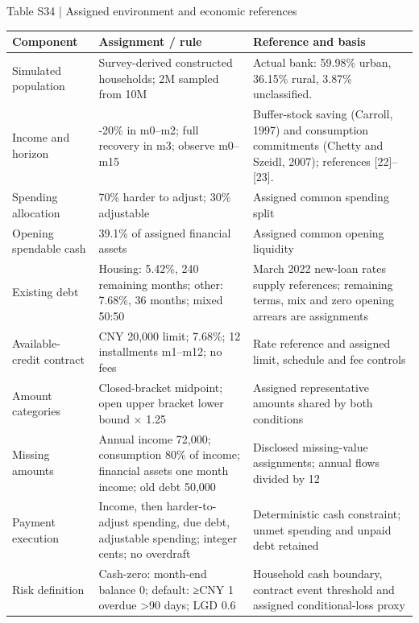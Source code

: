 \documentclass[10pt]{article}
\begin{document}
\begin{center}
\begin{minipage}{\textwidth}
\fontsize{8.5}{10.3}\selectfont
Table S34 | Assigned environment and economic references
\par\vspace{4pt}
\begin{tabularx}{\textwidth}{@{}XXX@{}}
\toprule
Component & Assignment / rule & Reference and basis \\
\midrule
Simulated population & Survey-derived constructed households; 2M sampled from 10M & Actual bank: 59.98\% urban, 36.15\% rural, 3.87\% unclassified. \\
Income and horizon & -20\% in m0–m2; full recovery in m3; observe m0–m15 & Buffer-stock saving (Carroll, 1997) and consumption commitments (Chetty and Szeidl, 2007); references [22]–[23]. \\
Spending allocation & 70\% harder to adjust; 30\% adjustable & Assigned common spending split \\
Opening spendable cash & 39.1\% of assigned financial assets & Assigned common opening liquidity \\
Existing debt & Housing: 5.42\%, 240 remaining months; other: 7.68\%, 36 months; mixed 50:50 & March 2022 new-loan rates supply references; remaining terms, mix and zero opening arrears are assignments \\
Available-credit contract & CNY 20,000 limit; 7.68\%; 12 installments m1–m12; no fees & Rate reference and assigned limit, schedule and fee controls \\
Amount categories & Closed-bracket midpoint; open upper bracket lower bound \ensuremath{\times} 1.25 & Assigned representative amounts shared by both conditions \\
Missing amounts & Annual income 72,000; consumption 80\% of income; financial assets one month income; old debt 50,000 & Disclosed missing-value assignments; annual flows divided by 12 \\
Payment execution & Income, then harder-to-adjust spending, due debt, adjustable spending; integer cents; no overdraft & Deterministic cash constraint; unmet spending and unpaid debt retained \\
Risk definition & Cash-zero: month-end balance 0; default: ≥CNY 1 overdue >90 days; LGD 0.6 & Household cash boundary, contract event threshold and assigned conditional-loss proxy \\
\bottomrule
\end{tabularx}

\end{minipage}
\end{center}
\end{document}
